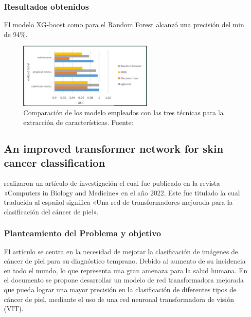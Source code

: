 \subsubsection{Resultados obtenidos}
El modelo XG-boost como para el Random Forest alcanzó una precisión del min de 94\%. 


\begin{figure}[h]
	\begin{center}
		\includegraphics[width=0.6\textwidth]{2/figuras/Skin_cancer_classification_imagen_01.png}
		\caption{Comparación de los modelo empleados con las  tres técnicas para la extracción de características. Fuente: \cite{ali_2022multiclass}}
		\label{1:fig 11}
	\end{center}
\end{figure}





\subsection{An improved transformer network for skin cancer classification \citep*{xin2022improved}}
\citeauthor{xin2022improved} realizaron un artículo de investigación el cual fue publicado en la revista «Computers in Biology and Medicine» en el año 2022. Este fue titulado  la cual traducida al español significa «Una red de transformadores mejorada para la clasificación del cáncer de piel».


\subsubsection{Planteamiento del Problema y objetivo}

El artículo se centra en la necesidad de mejorar la clasificación de imágenes de cáncer de piel para su diagnóstico temprano. Debido al aumento de su incidencia en todo el mundo, lo que representa una gran amenaza para la salud humana. 
En el documento se propone desarrollar un modelo de red transformadora mejorada que pueda lograr una mayor precisión en la clasificación de diferentes tipos de cáncer de piel, mediante el uso de una red neuronal transformadora de visión (VIT).





